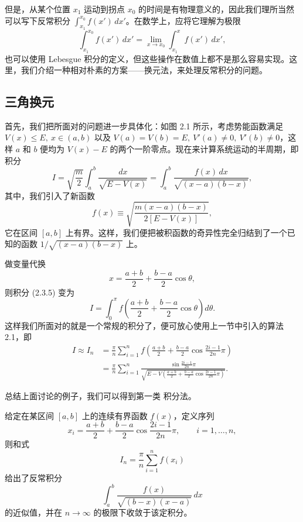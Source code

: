 但是，从某个位置 $x_1$ 运动到拐点 $x_0$ 的时间是有物理意义的，因此我们理所当然可以写下反常积分 $\int_{x_1}^{x_0}f(x')\,dx'$。在数学上，应将它理解为极限
\[
\int_{x_1}^{x_0}f(x')\,dx'=\lim_{x\to x_0}\int_{x_1}^{x}f(x')\,dx',
\]
也可以使用 Lebesgue 积分的定义，但这些操作在数值上都不是那么容易实现。这里，我们介绍一种相对朴素的方案——换元法，来处理反常积分的问题。

\subsection{三角换元}

首先，我们把所面对的问题进一步具体化：如图 2.1 所示，考虑势能函数满足 $V(x)\le E,\ x\in(a,b)$ 以及 $V(a)=V(b)=E,\ V'(a)\ne0,\ V'(b)\ne0$，这样 $a$ 和 $b$ 便均为 $V(x)-E$ 的两个一阶零点。现在来计算系统运动的半周期，即积分
\begin{equation}
I=\sqrt{\frac m2}\int_a^b\frac{dx}{\sqrt{E-V(x)}}
=\int_a^b\frac{f(x)\,dx}{\sqrt{(x-a)(b-x)}},
\tag{2.3.5}
\end{equation}
其中，我们引入了新函数
\[
f(x)\equiv\sqrt{\frac{m(x-a)(b-x)}{2[E-V(x)]}},
\]
它在区间 $[a,b]$ 上有界。这样，我们便把被积函数的奇异性完全归结到了一个已知的函数 $1/\sqrt{(x-a)(b-x)}$ 上。

做变量代换
\begin{equation}
x=\frac{a+b}{2}+\frac{b-a}{2}\cos\theta,
\tag{2.3.6}
\end{equation}
则积分 (2.3.5) 变为
\begin{equation}
I=\int_0^\pi f\left(\frac{a+b}{2}+\frac{b-a}{2}\cos\theta\right)d\theta.
\tag{2.3.7}
\end{equation}
这样我们所面对的就是一个常规的积分了，便可放心使用上一节中引入的算法 2.1，即
\begin{equation}
\begin{aligned}
I\approx I_n
&=\frac\pi n\sum_{i=1}^{n}f\left(\frac{a+b}{2}+\frac{b-a}{2}\cos\frac{2i-1}{2n}\pi\right)\\
&=\frac\pi n\sum_{i=1}^{n}\frac{\sin\frac{2i-1}{2n}\pi}
{\sqrt{E-V\left(\frac{a+b}{2}+\frac{b-a}{2}\cos\frac{2i-1}{2n}\pi\right)}}.
\end{aligned}
\tag{2.3.8}
\end{equation}

总结上面讨论的例子，我们可以得到第一类 \ChebName{} 积分法。

\begin{algorithmBox}
给定在某区间 $[a,b]$ 上的连续有界函数 $f(x)$，定义序列
\[
x_i=\frac{a+b}{2}+\frac{b-a}{2}\cos\frac{2i-1}{2n}\pi,\qquad i=1,\ldots,n,
\]
则和式
\[
I_n=\frac\pi n\sum_{i=1}^{n}f(x_i)
\]
给出了反常积分
\[
\int_a^b\frac{f(x)}{\sqrt{(b-x)(x-a)}}\,dx
\]
的近似值，并在 $n\to\infty$ 的极限下收敛于该定积分。
\end{algorithmBox}

